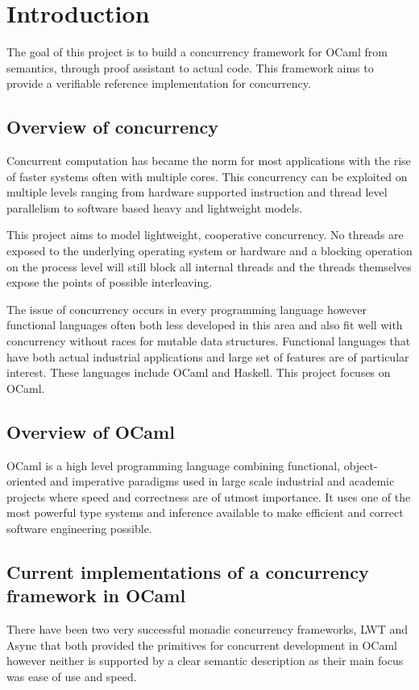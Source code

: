 \documentclass[12pt,twoside,notitlepage]{report}
\begin{document}
\setcounter{page}{1}
\pagestyle{headings}

\chapter{Introduction}

The goal of this project is to build a concurrency framework for OCaml from semantics, through proof assistant to actual code. This framework aims to provide a verifiable reference implementation for concurrency. 

\section{Overview of concurrency}
Concurrent computation has became the norm for most applications with the rise of faster systems often with multiple cores. This concurrency can be exploited on multiple levels ranging from hardware supported instruction and thread level parallelism to software based heavy and lightweight models. 

This project aims to model lightweight, cooperative concurrency. No threads are exposed to the underlying operating system or hardware and a blocking operation on the process level will still block all internal threads and the threads themselves expose the points of possible interleaving. 

The issue of concurrency occurs in every programming language however functional languages often both less developed in this area and also fit well with concurrency without races for mutable data structures. Functional languages that have both actual industrial applications and large set of features are of particular interest. These languages include OCaml and Haskell. This project focuses on OCaml. 

\section{Overview of OCaml}
OCaml is a high level programming language combining functional, object-oriented and imperative paradigms used in large scale industrial and academic projects where speed and correctness are of utmost importance. It uses one of the most powerful type systems and inference available to make efficient and correct software engineering possible.
  

\section{Current implementations of a concurrency framework in OCaml}
There have been two very successful monadic concurrency frameworks, LWT\cite{LWT} and Async\cite{Async} that both provided the primitives for concurrent development in OCaml however neither is supported by a clear semantic description as their main focus was ease of use and speed. 
\end{document}
